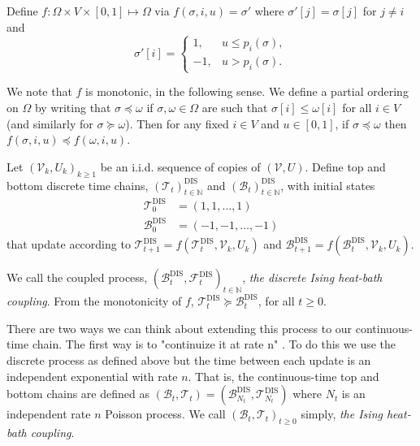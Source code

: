 	Define $f: \Omega \times V \times [0,1] \mapsto \Omega$ via $f(\sigma, i, u) = \sigma'$ where $\sigma'[j] = \sigma[j]$ for $j \neq i$ and
	\begin{equation}
		\sigma'[i] = 
			\begin{cases}
				1, &u \leq p_i(\sigma),\\
				-1, &u > p_i(\sigma).
			\end{cases}
		\label{eq:plusorminusrules}
	\end{equation}

	We note that $f$ is monotonic, in the following sense. We define a partial ordering on $\Omega$ by writing that $\sigma \preceq \omega$ if $\sigma, \omega \in \Omega$ are such that $\sigma[i] \leq \omega[i]$ for all $i \in V$ (and similarly for $\sigma \succeq \omega$). Then for any fixed $i \in V$ and $u \in [0,1]$, if $\sigma \preceq \omega$ then $f(\sigma, i, u) \preceq f(\omega, i, u)$.
	
	Let $(\mathscr{V}_k, U_k)_{k \geq 1}$ be an i.i.d. sequence of copies of $(\mathscr{V}, U)$. Define top and bottom discrete time chains, $(\mathscr{T}_t)_{t\in \mathbb{N}}^\mathrm{DIS}$ and $(\mathscr{B}_t)_{t\in \mathbb{N}}^\mathrm{DIS}$, with initial states
	\begin{align}
		\mathscr{T}_0^\mathrm{DIS} &= (1, 1, \dots, 1)\\
		\mathscr{B}_0^\mathrm{DIS} &= (-1, -1, \dots, -1)
	\end{align}
	that update according to $\mathscr{T}_{t+1}^\mathrm{DIS} = f(\mathscr{T}_{t}^\mathrm{DIS}, \mathscr{V}_k, U_k)$ and $\mathscr{B}_{t+1}^\mathrm{DIS} = f(\mathscr{B}_{t}^\mathrm{DIS}, \mathscr{V}_k, U_k)$.

	We call the coupled process, $(\mathscr{B}_t^\mathrm{DIS}, \mathscr{F}_t^\mathrm{DIS})_{t\in \mathbb{N}}$, \emph{the discrete Ising heat-bath coupling}. From the monotonicity of $f$, $\mathscr{T}_t^\mathrm{DIS} \succeq \mathscr{B}_t^\mathrm{DIS}$, for all $t \geq 0$.

	There are two ways we can think about extending this process to our continuous-time chain. The first way is to "continuize it at rate n" \cite{Levin2009-fo}. To do this we use the discrete process as defined above but the time between each update is an independent exponential with rate $n$. That is, the continuous-time top and bottom chains are defined as $(\mathscr{B}_t, \mathscr{T}_t) = (\mathscr{B}_{N_t}^\mathrm{DIS}, \mathscr{T}_{N_t}^\mathrm{DIS})$ where $N_t$ is an independent rate $n$ Poisson process. We call $(\mathscr{B}_t, \mathscr{T}_t)_{t\geq 0}$ simply, \emph{the Ising heat-bath coupling}.

